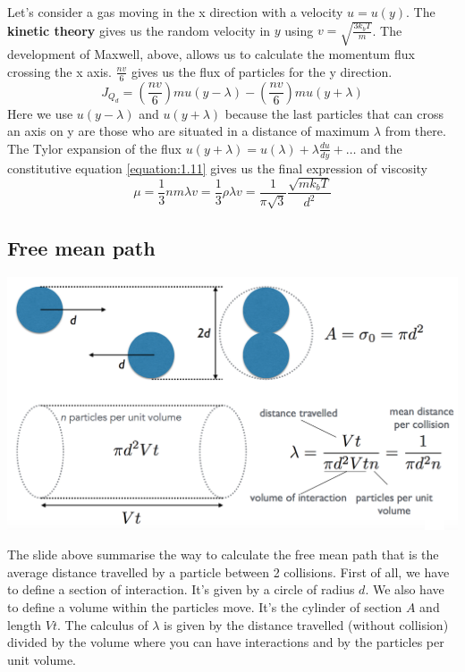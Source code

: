	Let's consider a gas moving in the x direction with a velocity $u=u(y)$. The \textbf{kinetic theory} gives us the random velocity in $y$ using $v = \sqrt{\frac{3k_bT}{m}}$. The development of Maxwell, above, allows us to calculate the momentum flux crossing the x axis. $\frac{nv}{6}$ gives us the flux of particles for the y direction. 
	\begin{equation}
		J_{Q_d} = \left(\frac{nv}{6}\right)mu(y-\lambda) - \left(\frac{nv}{6}\right)mu(y+\lambda)
	\end{equation}
	Here we use $u(y-\lambda)$ and $u(y+\lambda)$ because the last particles that can cross an axis on y are those who are situated in a distance of maximum $\lambda$ from there. \\
	The Tylor expansion of the flux $u(y + \lambda) = u(\lambda) + \lambda\frac{du}{dy} + \dots$ and the constitutive equation \eqref{equation:1.11} gives us the final expression of viscosity 
	\begin{equation}
	\mu = \frac{1}{3}nm\lambda v = \frac{1}{3}\rho \lambda v = \frac{1}{\pi \sqrt{3}}\frac{\sqrt{mk_bT}}{d^2}
	\label{equation:1.15}
	\end{equation}
	
\subsection{Free mean path}
	\begin{center}
	\includegraphics[scale=0.45]{ch1/9}
	\end{center}
	The slide above summarise the way to calculate the free mean path that is the average distance travelled by a particle between 2 collisions. First of all, we have to define a section of interaction. It's given by a circle of radius $d$. We also have to define a volume within the particles move. It's the cylinder of section $A$ and length $Vt$. The calculus of $\lambda$ is given by the distance travelled (without collision) divided by the volume where you can have interactions and by the particles per unit volume. 
	
